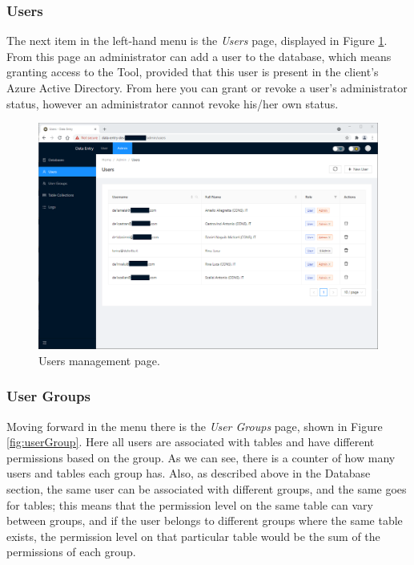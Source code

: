\subsubsection{Users}

The next item in the left-hand menu is the \emph{Users} page, displayed in Figure \ref{fig:users}. From this page an administrator can add a user to the database, which means granting access to the Tool, provided that this user is present in the client's Azure Active Directory. From here you can grant or revoke a user's administrator status, however an administrator cannot revoke his/her own status.
\begin{figure}[!htb]
    \centering
    \includegraphics[width=15.8cm]{chapters/images/ch_3/FE/Admin/users.png}
    \caption{Users management page.}
    \label{fig:users}
\end{figure}

\subsubsection{User Groups}
Moving forward in the menu there is the \emph{User Groups} page, shown in Figure \ref{fig:userGroup}. Here all users are associated with tables and have different permissions based on the group. As we can see, there is a counter of how many users and tables each group has. Also, as described above in the Database section, the same user can be associated with different groups, and the same goes for tables; this means that the permission level on the same table can vary between groups, and if the user belongs to different groups where the same table exists, the permission level on that particular table would be the sum of the permissions of each group.

